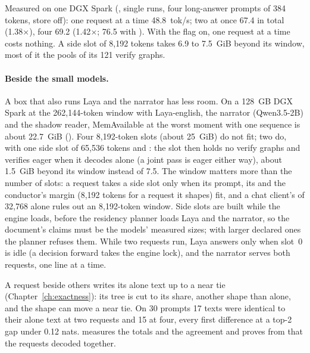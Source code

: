 Measured on one DGX Spark (\measured, single runs, four long-answer prompts of 384 tokens, store off): one request at a time 48.8~tok/s; two at once 67.4 in total (1.38$\times$), four 69.2 (1.42$\times$; 76.5 with ). With the flag on, one request at a time costs nothing. A side slot of 8,192 tokens takes 6.9 to 7.5~GiB beyond its window, most of it the pools of its 121 verify graphs.

\paragraph{Beside the small models.} A box that also runs Laya and the narrator has less room. On a 128~GB DGX Spark at the 262,144-token window with Laya-english, the narrator (Qwen3.5-2B) and the shadow reader, MemAvailable at the worst moment with one sequence is about 22.7~GiB (\measured). Four 8,192-token slots (about 25~GiB) do not fit; two do, with one side slot of 65,536 tokens and : the slot then holds no verify graphs and verifies eager when it decodes alone (a joint pass is eager either way), about 1.5~GiB beyond its window instead of 7.5. The window matters more than the number of slots: a request takes a side slot only when its prompt, its  and the conductor's margin (8,192 tokens for a request it shapes) fit, and a chat client's  of 32,768 alone rules out an 8,192-token window. Side slots are built while the engine loads, before the residency planner loads Laya and the narrator, so the  document's claims must be the models' measured sizes; with larger declared ones the planner refuses them. While two requests run, Laya answers only when slot~0 is idle (a decision forward takes the engine lock), and the narrator serves both requests, one line at a time.

A request beside others writes its alone text up to a near tie (Chapter~\ref{ch:exactness}): its tree is cut to its share, another shape than alone, and the shape can move a near tie. On 30 prompts 17 texts were identical to their alone text at two requests and 15 at four, every first difference at a top-2 gap under 0.12 nats.  measures the totals and the agreement and proves from  that the requests decoded together.

